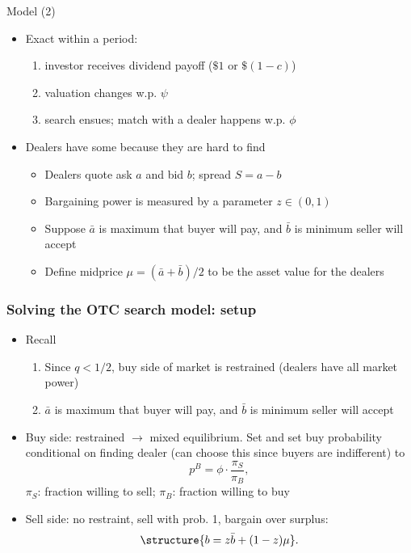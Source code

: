 \documentclass[english,10pt
,aspectratio=169
]{beamer}
\begin{document}
\begin{frame}{Model (2)}
	\begin{itemize}
		\item Exact  within a period:
		\begin{enumerate}
			\item investor receives dividend payoff ($\$1$ or $\$(1-c)$)
			\item valuation changes w.p. $\psi$
			\item search ensues; match with a dealer happens w.p. $\phi$
		\end{enumerate}
		\item Dealers have some  because they are hard to find
		\begin{itemize}
			\item Dealers quote ask $a$ and bid $b$; spread $S=a-b$
			\item Bargaining power is measured by a parameter $z \in (0,1)$
			\item Suppose $\bar{a}$ is maximum that buyer will pay,  and $\bar{b}$ is minimum seller will accept
			\item Define midprice $\mu=(\bar{a}+\bar{b})/2$ to be the asset value for the dealers
		\end{itemize}
	\end{itemize}
\end{frame}


\begin{frame}[label=solve]
	\frametitle{Solving the OTC search model: setup}
	\begin{itemize}
		\item Recall
		\begin{enumerate}
			\item Since $q<1/2$, buy side of market is restrained (dealers have all market power)
			\item $\bar{a}$ is maximum that buyer will pay,  and $\bar{b}$ is minimum seller will accept
		\end{enumerate}
		\item \alert{Buy side:} restrained $\rightarrow$ mixed equilibrium. Set  and set buy probability conditional on finding dealer (can choose this since buyers are indifferent) to
		\[
		p^B = \phi \cdot \frac{\pi_S}{\pi_B},
		\]
		\alert{$\pi_S$}: fraction willing to sell; \alert{$\pi_B$}: fraction willing to buy
		\item \alert{Sell side:} no restraint, sell with prob. 1, bargain over surplus: 
		\[
		\structure{b=z\bar{b}+(1-z)\mu}.
		\]
	\end{itemize}
\end{frame}
\end{document}

